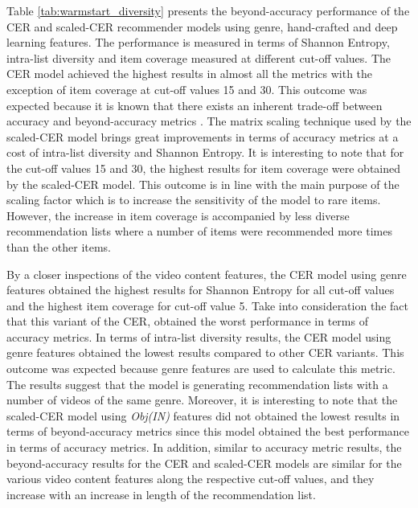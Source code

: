 \documentclass[review]{elsarticle}
\begin{document}
Table \ref{tab:warmstart_diversity} presents the beyond-accuracy performance of the CER and scaled-CER recommender models using genre, hand-crafted and deep learning features. The performance is measured in terms of Shannon Entropy, intra-list diversity and item coverage measured at different cut-off values. The CER model achieved the highest results in almost all the metrics with the exception of item coverage at cut-off values 15 and 30. This outcome was expected because it is known that there exists an inherent trade-off between accuracy and beyond-accuracy metrics \citep{adomavicius2011improving}. The matrix scaling technique used by the scaled-CER model brings great improvements in terms of accuracy metrics at a cost of intra-list diversity and Shannon Entropy. It is interesting to note that for the cut-off values 15 and 30, the highest results for item coverage were obtained by the scaled-CER model. This outcome is in line with the main purpose of the scaling factor which is to increase the sensitivity of the model to rare items. However, the increase in item coverage is accompanied by less diverse recommendation lists where a number of items were recommended more times than the other items. 

By a closer inspections of the video content features, the CER model using genre features obtained the highest results for Shannon Entropy for all cut-off values and the highest item coverage for cut-off value 5. Take into consideration the fact that this variant of the CER, obtained the worst performance in terms of accuracy metrics. In terms of intra-list diversity results, the CER model using genre features obtained the lowest results compared to other CER variants. This outcome was expected because genre features are used to calculate this metric. The results suggest that the model is generating recommendation lists with a number of videos of the same genre. Moreover, it is interesting to note that the scaled-CER model using \textit{Obj(IN)} features did not obtained the lowest results in terms of beyond-accuracy metrics since this model obtained the best performance in terms of accuracy metrics. In addition, similar to accuracy metric results, the beyond-accuracy results for the CER and scaled-CER models are similar for the various video content features along the respective cut-off values, and they increase with an increase in length of the recommendation list.  
\end{document}
